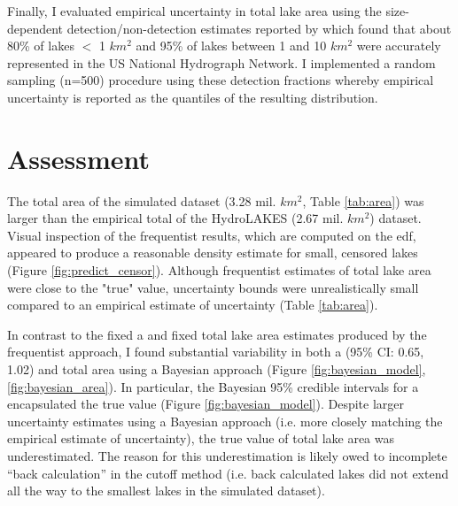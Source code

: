 \documentclass{article}
\begin{document}
Finally, I evaluated empirical uncertainty in total lake area using the size-dependent detection/non-detection estimates reported by \citet{cheruvelil2021lagos} which found that about 80\% of lakes $<$ 1 $km^2$ and 95\% of lakes between 1 and 10 $km^2$ were accurately represented in the US National Hydrograph Network. I implemented a random sampling (n=500) procedure using these detection fractions whereby empirical uncertainty is reported as the quantiles of the resulting distribution.

\section{Assessment}

The total area of the simulated dataset (3.28 mil. $km^2$, Table \ref{tab:area}) was larger than the empirical total of the HydroLAKES (2.67 mil. $km^2$) dataset. Visual inspection of the frequentist results, which are computed on the edf, appeared to produce a reasonable density estimate for small, censored lakes (Figure \ref{fig:predict_censor}). Although frequentist estimates of total lake area were close to the "true" value, uncertainty bounds were unrealistically small compared to an empirical estimate of uncertainty (Table \ref{tab:area}).

In contrast to the fixed a and fixed total lake area estimates produced by the frequentist approach, I found substantial variability in both a (95\% CI: 0.65, 1.02) and total area using a Bayesian approach (Figure \ref{fig:bayesian_model}, \ref{fig:bayesian_area}). In particular, the Bayesian 95\% credible intervals for a encapsulated the true value (Figure \ref{fig:bayesian_model}). Despite larger uncertainty estimates using a Bayesian approach (i.e. more closely matching the empirical estimate of uncertainty), the true value of total lake area was underestimated. The reason for this underestimation is likely owed to incomplete “back calculation” in the cutoff method (i.e. back calculated lakes did not extend all the way to the smallest lakes in the simulated dataset).
\end{document}
